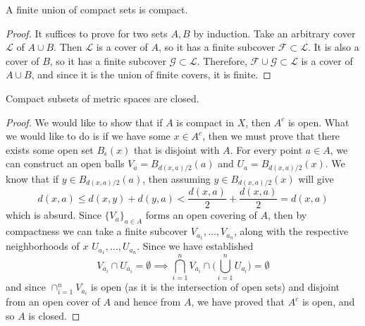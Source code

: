 \documentclass{article}
\begin{document}
    \begin{theorem}
      A finite union of compact sets is compact. 
    \end{theorem}
    \begin{proof}
      It suffices to prove for two sets $A, B$ by induction. Take an arbitrary cover $\mathscr{L}$ of $A \cup B$. Then $\mathscr{L}$ is a cover of $A$, so it has a finite subcover $\mathscr{F} \subset \mathscr{L}$. It is also a cover of $B$, so it has a finite subcover $\mathscr{G} \subset \mathscr{L}$. Therefore, $\mathscr{F} \cup \mathscr{G} \subset \mathscr{L}$ is a cover of $A \cup B$, and since it is the union of finite covers, it is finite. 
    \end{proof}

    \begin{theorem}
      Compact subsets of metric spaces are closed. 
    \end{theorem}
    \begin{proof}
      We would like to show that if $A$ is compact in $X$, then $A^c$ is open. What we would like to do is if we have some $x \in A^c$, then we must prove that there exists some open set $B_\epsilon (x)$ that is disjoint with $A$. For every point $a \in A$, we can construct an open balls $V_a = B_{d(x, a)/2} (a)$ and $U_a = B_{d(x, a)/2} (x)$. We know that if $y \in B_{d(x, a)/2}(a)$, then assuming $y \in B_{d(x, a)/2} (x)$ will give
      \begin{equation}
        d(x, a) \leq d(x, y) + d(y, a) < \frac{d(x, a)}{2} + \frac{d(x, a)}{2} = d(x, a)
      \end{equation}
      which is absurd. 
      Since $\{V_a\}_{a \in A}$ forms an open covering of $A$, then by compactness we can take a finite subcover $V_{a_1}, \ldots, V_{a_n}$, along with the respective neighborhoods of $x$ $U_{a_1}, \ldots, U_{a_n}$. Since we have established 
      \begin{equation}
        V_{a_i} \cap U_{a_i} = \emptyset \implies \bigcap_{i=1}^n V_{a_i} \cap \bigg( \bigcup_{i=1}^n U_{a_i} \bigg) = \emptyset
      \end{equation}
      and since $\cap_{i=1}^n V_{a_i}$ is open (as it is the intersection of open sets) and disjoint from an open cover of $A$ and hence from $A$, we have proved that $A^c$ is open, and so $A$ is closed. 
    \end{proof}
\end{document}
